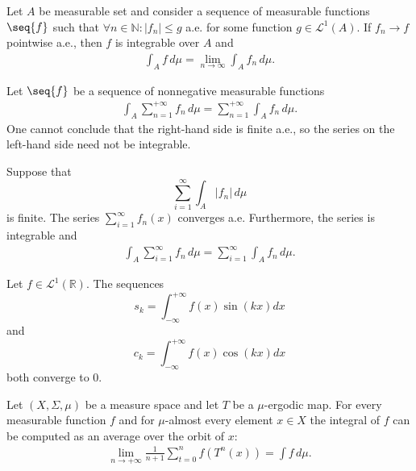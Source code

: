     \begin{theorem}\label{lebesgue:dominated_convergence_theorem}
        Let $A$ be measurable set and consider a sequence of measurable functions $\seq{f}$ such that $\forall n\in\mathbb{N}:|f_n|\leq g$ a.e. for some function $g\in\mathcal{L}^1(A)$. If $f_n\rightarrow f$ pointwise a.e., then $f$ is integrable over $A$ and
        \begin{gather}
            \int_Af\,d\mu = \lim_{n\rightarrow\infty}\int_Af_n\,d\mu.
        \end{gather}
    \end{theorem}

    \begin{property}
        Let $\seq{f}$ be a sequence of nonnegative measurable functions
        \begin{gather}
            \int_A\sum_{n=1}^{+\infty}f_n\,d\mu = \sum_{n=1}^{+\infty}\int_Af_n\,d\mu.
        \end{gather}
        One cannot conclude that the right-hand side is finite a.e., so the series on the left-hand side need not be integrable.
    \end{property}

    \begin{theorem}\label{lebesgue:beppo_levi}
        Suppose that \[\sum_{i=1}^\infty\int_A|f_n|\,d\mu\] is finite. The series $\sum_{i=1}^\infty f_n(x)$ converges a.e. Furthermore, the series is integrable and
        \begin{gather}
            \int_A\sum_{i=1}^\infty f_n\,d\mu = \sum_{i=1}^\infty\int_Af_n\,d\mu.
        \end{gather}
    \end{theorem}

    \begin{theorem}\label{lebesgue:riemann_lebesue_lemma}
        Let $f\in\mathcal{L}^1(\mathbb{R})$. The sequences \[s_k = \int_{-\infty}^{+\infty}f(x)\sin(kx)dx\] and \[c_k = \int_{-\infty}^{+\infty}f(x)\cos(kx)dx\] both converge to 0.
    \end{theorem}

    \begin{theorem}\label{lebesgue:ergodic}
        Let $(X,\Sigma,\mu)$ be a measure space and let $T$ be a $\mu$-ergodic map. For every measurable function $f$ and for $\mu$-almost every element $x\in X$ the integral of $f$ can be computed as an average over the orbit of $x$:
        \begin{gather}
            \lim_{n\rightarrow+\infty}\frac{1}{n+1}\sum_{t=0}^nf(T^n(x)) = \int f\,d\mu.
        \end{gather}
    \end{theorem}

